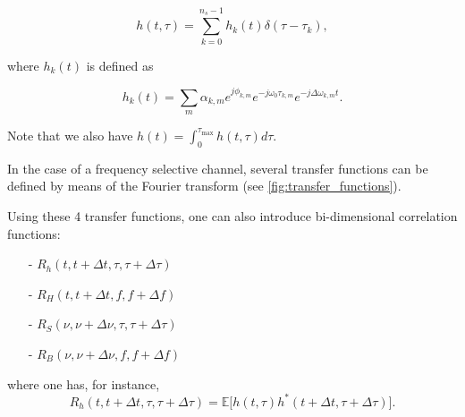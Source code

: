 \documentclass [a4paper, 11pt] {article}
\begin{document}
\begin{reminder}
\begin{itemize}
        \begin{equation}
        h(t,\tau) = \sum_{k=0}^{n_s - 1}h_k(t)\delta(\tau-\tau_k),
        \end{equation}
        
        where $h_k(t)$ is defined as 
        
        \begin{equation}
        h_k(t) = \sum_m \alpha_{k,m} e^{j\phi_{k,m}}e^{-j\omega_0 \tau_{k,m}}e^{-j\Delta \omega_{k,m} t}.
        \end{equation}
    
    
    
    Note that we also have $h(t) = \int_{0}^{\tau_{\text{max}}} h(t,\tau)d\tau$. 
    
    
    
    
    
    In the case of a frequency selective channel, several transfer functions can be defined by means of the Fourier transform (see \autoref{fig:transfer_functions}).
    
    
     
    Using these 4 transfer functions, one can also introduce bi-dimensional correlation functions: 
    
    \begin{minipage}{0.45\textwidth}
    \begin{itemize}
        \item[-] $R_h(t,t+\Delta t, \tau, \tau + \Delta \tau)$
        \item[-] $R_H(t,t+\Delta t, f, f + \Delta f)$
    \end{itemize}
    \end{minipage}
        \hfill
    \begin{minipage}{0.45\textwidth}
    \begin{itemize}
        \item[-] $R_S(\nu,\nu+\Delta \nu, \tau, \tau + \Delta \tau)$
        \item[-] $R_B(\nu,\nu+\Delta \nu, f, f + \Delta f)$
    \end{itemize}
    \end{minipage}
    
    \medskip
    
    
    where one has, for instance, 
    \begin{equation}R_h(t,t+\Delta t, \tau, \tau + \Delta \tau) = \mathbb{E}\Big[h(t,\tau)h^*(t+\Delta t,\tau + \Delta \tau)\Big].
    \end{equation}
    

\end{itemize}
\end{reminder}
\end{document}
